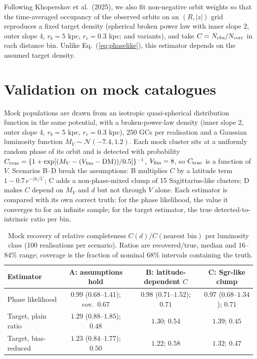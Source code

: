 \documentclass[11pt,a4paper]{article}
\newcommand{\MV}{M_V}
\newcommand{\dhel}{d}
\begin{document}
Following Khoperskov et al.\ (2025), we also fit non-negative orbit weights so that the
time-averaged occupancy of the observed orbits on an $(R,|z|)$ grid reproduces a fixed target
density (spherical broken power law with inner slope 2, outer slope 4, $r_b = 5$ kpc, $r_c = 0.3$
kpc; and variants), and take $C = N_{\rm obs}/N_{\rm corr}$ in each distance bin. Unlike
Eq.~(\ref{eq:phaselike}), this estimator depends on the assumed target density.

\section{Validation on mock catalogues}
\label{sec:mocks}

Mock populations are drawn from an isotropic quasi-spherical distribution function in the same
potential, with a broken-power-law density (inner slope 2, outer slope 4, $r_b = 5$ kpc,
$r_c = 0.3$ kpc), 250 GCs per realisation and a Gaussian luminosity function
$\MV \sim \mathcal{N}(-7.4, 1.2)$. Each mock cluster sits at a uniformly random phase of its orbit
and is detected with probability $C_{\rm true} = \{1+\exp[(\MV - (V_{\rm lim} - {\rm DM}))/0.5]\}^{-1}$,
$V_{\rm lim} = 8$, so $C_{\rm true}$ is a function of $V$. Scenarios B--D break the assumptions:
B multiplies $C$ by a latitude term $1 - 0.7\,e^{-|b|/5^\circ}$; C adds a non-phase-mixed clump of
15 Sagittarius-like clusters; D makes $C$ depend on $\MV$ and $\dhel$ but not through $V$ alone. Each
estimator is compared with its own correct truth: for the phase likelihood, the value it converges to
for an infinite sample; for the target estimator, the true detected-to-intrinsic ratio per bin.

\begin{table}[h]
\centering
\caption{Mock recovery of relative completeness $C(\dhel)/C(\text{nearest bin})$ per luminosity class
(100 realisations per scenario). Ratios are recovered/true, median and 16--84\% range; coverage is
the fraction of nominal 68\% intervals containing the truth.}
\label{tab:mock_classes}
\small\setlength{\tabcolsep}{4pt}
\begin{tabular}{lccc}
\toprule
Estimator & A: assumptions hold & B: latitude-dependent $C$ & C: Sgr-like clump \\
\midrule
Phase likelihood & $0.99$ ($0.68$--$1.41$); cov.\ $0.67$ & $0.98$ ($0.71$--$1.52$); $0.71$ & $0.97$ ($0.68$--$1.34$); $0.71$ \\
Target, plain ratio & $1.29$ ($0.88$--$1.85$); $0.48$ & $1.30$; $0.54$ & $1.39$; $0.45$ \\
Target, bias-reduced & $1.23$ ($0.84$--$1.77$); $0.50$ & $1.22$; $0.58$ & $1.32$; $0.47$ \\
\bottomrule
\end{tabular}
\end{table}
\end{document}
